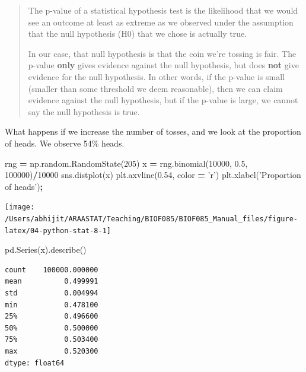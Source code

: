 \documentclass[
  letterpaper,
]{scrbook}
\newenvironment{Shaded}{\begin{snugshade}}{\end{snugshade}}
\newcommand{\DecValTok}[1]{\textcolor[rgb]{0.00,0.00,0.81}{#1}}
\newcommand{\FloatTok}[1]{\textcolor[rgb]{0.00,0.00,0.81}{#1}}
\newcommand{\NormalTok}[1]{#1}
\newcommand{\OperatorTok}[1]{\textcolor[rgb]{0.81,0.36,0.00}{\textbf{#1}}}
\newcommand{\StringTok}[1]{\textcolor[rgb]{0.31,0.60,0.02}{#1}}
\begin{document}
\begin{quote}
The p-value of a statistical hypothesis test is the likelihood that we would see an outcome at least as extreme as we observed under the assumption that the null hypothesis (H0) that we chose is actually true.

In our case, that null hypothesis is that the coin we're tossing is fair. The p-value \textbf{only} gives evidence against the null hypothesis, but does \textbf{not} give evidence for the null hypothesis. In other words, if the p-value is small (smaller than some threshold we deem reasonable), then we can claim evidence against the null hypothesis, but if the p-value is large, we cannot say the null hypothesis is true.
\end{quote}

What happens if we increase the number of tosses, and we look at the proportion of heads. We observe 54\% heads.

\begin{Shaded}
\begin{Highlighting}[]
\NormalTok{rng }\OperatorTok{=}\NormalTok{ np.random.RandomState(}\DecValTok{205}\NormalTok{)}
\NormalTok{x }\OperatorTok{=}\NormalTok{ rng.binomial(}\DecValTok{10000}\NormalTok{, }\FloatTok{0.5}\NormalTok{, }\DecValTok{100000}\NormalTok{)}\OperatorTok{/}\DecValTok{10000}
\NormalTok{sns.distplot(x)}
\NormalTok{plt.axvline(}\FloatTok{0.54}\NormalTok{, color }\OperatorTok{=} \StringTok{'r'}\NormalTok{)}
\NormalTok{plt.xlabel(}\StringTok{'Proportion of heads'}\NormalTok{)}\OperatorTok{;}
\end{Highlighting}
\end{Shaded}

\begin{center}\texttt{[image: /Users/abhijit/ARAASTAT/Teaching/BIOF085/BIOF085\_Manual\_files/figure-latex/04-python-stat-8-1]} \end{center}

\begin{Shaded}
\begin{Highlighting}[]
\NormalTok{pd.Series(x).describe()}
\end{Highlighting}
\end{Shaded}

\begin{verbatim}
count    100000.000000
mean          0.499991
std           0.004994
min           0.478100
25%           0.496600
50%           0.500000
75%           0.503400
max           0.520300
dtype: float64
\end{verbatim}
\end{document}
